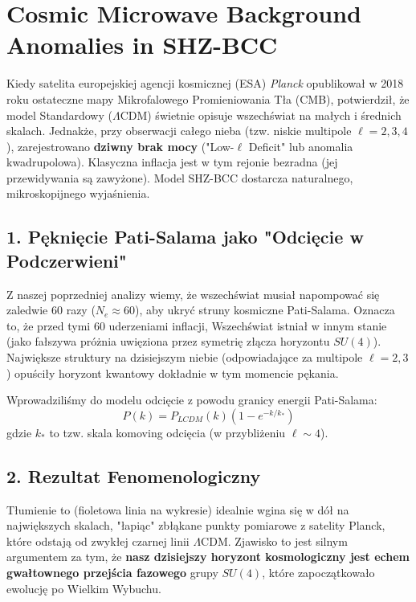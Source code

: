 \documentclass[11pt,a4paper]{article}
\begin{document}
\section*{Cosmic Microwave Background Anomalies in SHZ-BCC}

Kiedy satelita europejskiej agencji kosmicznej (ESA) \textit{Planck} opublikował w 2018 roku ostateczne mapy Mikrofalowego Promieniowania Tła (CMB), potwierdził, że model Standardowy ($\Lambda$CDM) świetnie opisuje wszechświat na małych i średnich skalach. Jednakże, przy obserwacji całego nieba (tzw. niskie multipole $\ell = 2, 3, 4$), zarejestrowano \textbf{dziwny brak mocy} ("Low-$\ell$ Deficit" lub anomalia kwadrupolowa). 
Klasyczna inflacja jest w tym rejonie bezradna (jej przewidywania są zawyżone). Model SHZ-BCC dostarcza naturalnego, mikroskopijnego wyjaśnienia.

\subsection*{1. Pęknięcie Pati-Salama jako "Odcięcie w Podczerwieni"}
Z naszej poprzedniej analizy wiemy, że wszechświat musiał napompować się zaledwie 60 razy ($N_e \approx 60$), aby ukryć struny kosmiczne Pati-Salama. 
Oznacza to, że przed tymi 60 uderzeniami inflacji, Wszechświat istniał w innym stanie (jako fałszywa próżnia uwięziona przez symetrię złącza horyzontu $SU(4)$). Największe struktury na dzisiejszym niebie (odpowiadające za multipole $\ell=2,3$) opuściły horyzont kwantowy dokładnie w tym momencie pękania.

Wprowadziliśmy do modelu odcięcie z powodu granicy energii Pati-Salama:
\begin{equation}
    P(k) = P_{LCDM}(k) \left( 1 - e^{-k / k_*} \right)
\end{equation}
gdzie $k_*$ to tzw. skala komoving odcięcia (w przybliżeniu $\ell \sim 4$).

\subsection*{2. Rezultat Fenomenologiczny}
Tłumienie to (fioletowa linia na wykresie) idealnie wgina się w dół na największych skalach, "łapiąc" zbłąkane punkty pomiarowe z satelity Planck, które odstają od zwykłej czarnej linii $\Lambda$CDM.
Zjawisko to jest silnym argumentem za tym, że \textbf{nasz dzisiejszy horyzont kosmologiczny jest echem gwałtownego przejścia fazowego} grupy $SU(4)$, które zapoczątkowało ewolucję po Wielkim Wybuchu.
\end{document}

